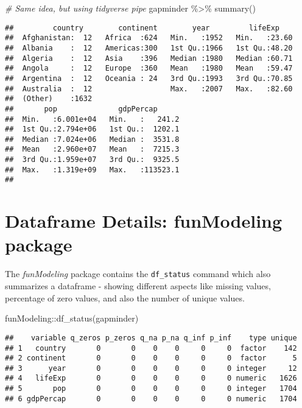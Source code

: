 \documentclass[
]{book}
\newenvironment{Shaded}{\begin{snugshade}}{\end{snugshade}}
\newcommand{\CommentTok}[1]{\textcolor[rgb]{0.56,0.35,0.01}{\textit{#1}}}
\newcommand{\FunctionTok}[1]{\textcolor[rgb]{0.00,0.00,0.00}{#1}}
\newcommand{\NormalTok}[1]{#1}
\newcommand{\SpecialCharTok}[1]{\textcolor[rgb]{0.00,0.00,0.00}{#1}}
\begin{document}
\begin{Shaded}
\begin{Highlighting}[]
\CommentTok{\# Same idea, but using tidyverse pipe}
\NormalTok{gapminder }\SpecialCharTok{\%\textgreater{}\%} \FunctionTok{summary}\NormalTok{()}
\end{Highlighting}
\end{Shaded}

\begin{verbatim}
##         country        continent        year         lifeExp     
##  Afghanistan:  12   Africa  :624   Min.   :1952   Min.   :23.60  
##  Albania    :  12   Americas:300   1st Qu.:1966   1st Qu.:48.20  
##  Algeria    :  12   Asia    :396   Median :1980   Median :60.71  
##  Angola     :  12   Europe  :360   Mean   :1980   Mean   :59.47  
##  Argentina  :  12   Oceania : 24   3rd Qu.:1993   3rd Qu.:70.85  
##  Australia  :  12                  Max.   :2007   Max.   :82.60  
##  (Other)    :1632                                                
##       pop              gdpPercap       
##  Min.   :6.001e+04   Min.   :   241.2  
##  1st Qu.:2.794e+06   1st Qu.:  1202.1  
##  Median :7.024e+06   Median :  3531.8  
##  Mean   :2.960e+07   Mean   :  7215.3  
##  3rd Qu.:1.959e+07   3rd Qu.:  9325.5  
##  Max.   :1.319e+09   Max.   :113523.1  
## 
\end{verbatim}

\hypertarget{dataframe-details-funmodeling-package}{%
\section{Dataframe Details: funModeling package}\label{dataframe-details-funmodeling-package}}

The \emph{funModeling} package contains the \texttt{df\_status} command which also summarizes
a dataframe - showing different aspects like missing values, percentage of zero
values, and also the number of unique values.

\begin{Shaded}
\begin{Highlighting}[]
\NormalTok{funModeling}\SpecialCharTok{::}\FunctionTok{df\_status}\NormalTok{(gapminder)}
\end{Highlighting}
\end{Shaded}

\begin{verbatim}
##    variable q_zeros p_zeros q_na p_na q_inf p_inf    type unique
## 1   country       0       0    0    0     0     0  factor    142
## 2 continent       0       0    0    0     0     0  factor      5
## 3      year       0       0    0    0     0     0 integer     12
## 4   lifeExp       0       0    0    0     0     0 numeric   1626
## 5       pop       0       0    0    0     0     0 integer   1704
## 6 gdpPercap       0       0    0    0     0     0 numeric   1704
\end{verbatim}
\end{document}
